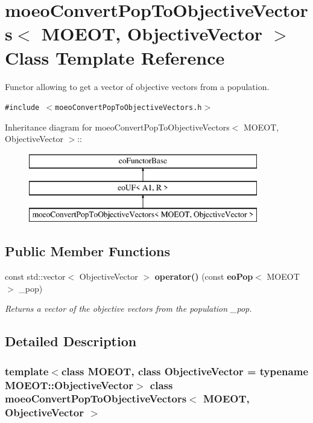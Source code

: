 \section{moeo\-Convert\-Pop\-To\-Objective\-Vectors$<$ MOEOT, Objective\-Vector $>$ Class Template Reference}
\label{classmoeoConvertPopToObjectiveVectors}
Functor allowing to get a vector of objective vectors from a population.  


{\tt \#include $<$moeo\-Convert\-Pop\-To\-Objective\-Vectors.h$>$}

Inheritance diagram for moeo\-Convert\-Pop\-To\-Objective\-Vectors$<$ MOEOT, Objective\-Vector $>$::\begin{figure}[H]
\begin{center}
\leavevmode
\includegraphics[height=3cm]{classmoeoConvertPopToObjectiveVectors}
\end{center}
\end{figure}
\subsection*{Public Member Functions}
\begin{CompactItemize}
\item 
const std::vector$<$ Objective\-Vector $>$ {\bf operator()} (const {\bf eo\-Pop}$<$ MOEOT $>$ \_\-pop)
\begin{CompactList}\small\item\em Returns a vector of the objective vectors from the population \_\-pop. \item\end{CompactList}\end{CompactItemize}


\subsection{Detailed Description}
\subsubsection*{template$<$class MOEOT, class Objective\-Vector = typename MOEOT::Objective\-Vector$>$ class moeo\-Convert\-Pop\-To\-Objective\-Vectors$<$ MOEOT, Objective\-Vector $>$}

